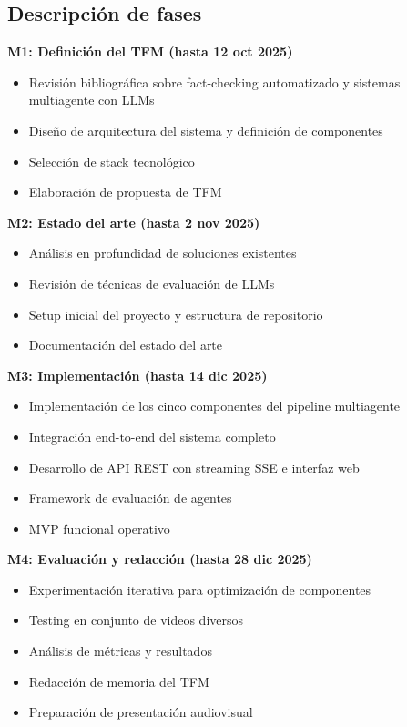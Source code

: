 \documentclass[12pt,a4paper]{article}
\begin{document}
\subsection{Descripción de fases}

\textbf{M1: Definición del TFM (hasta 12 oct 2025)}
\begin{itemize}
    \item Revisión bibliográfica sobre fact-checking automatizado y sistemas multiagente con LLMs
    \item Diseño de arquitectura del sistema y definición de componentes
    \item Selección de stack tecnológico
    \item Elaboración de propuesta de TFM
\end{itemize}

\textbf{M2: Estado del arte (hasta 2 nov 2025)}
\begin{itemize}
    \item Análisis en profundidad de soluciones existentes
    \item Revisión de técnicas de evaluación de LLMs
    \item Setup inicial del proyecto y estructura de repositorio
    \item Documentación del estado del arte
\end{itemize}

\textbf{M3: Implementación (hasta 14 dic 2025)}
\begin{itemize}
    \item Implementación de los cinco componentes del pipeline multiagente
    \item Integración end-to-end del sistema completo
    \item Desarrollo de API REST con streaming SSE e interfaz web
    \item Framework de evaluación de agentes
    \item MVP funcional operativo
\end{itemize}

\textbf{M4: Evaluación y redacción (hasta 28 dic 2025)}
\begin{itemize}
    \item Experimentación iterativa para optimización de componentes
    \item Testing en conjunto de videos diversos
    \item Análisis de métricas y resultados
    \item Redacción de memoria del TFM
    \item Preparación de presentación audiovisual
\end{itemize}
\end{document}
